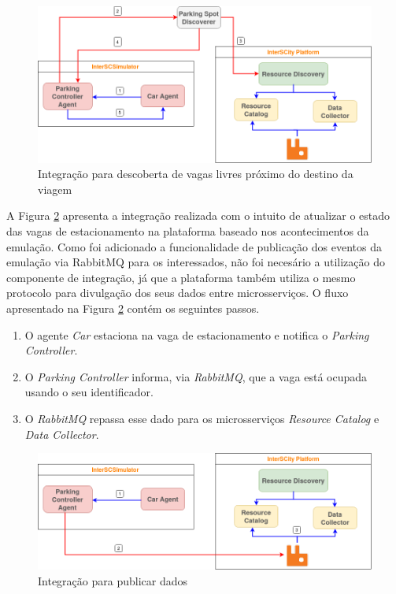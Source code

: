 \begin{figure}[ht]
	\centering
	\includegraphics[width=\textwidth]{figuras/integration_get_data_smart_parking.png}
	\caption{Integração para descoberta de vagas livres próximo do destino da
	viagem}
	\label{fig:descoberta}
\end{figure}

A Figura \ref{fig:atualizacao} apresenta a integração realizada com o intuito de atualizar o estado das vagas de estacionamento na plataforma baseado nos
acontecimentos da emulação.
Como foi adicionado a funcionalidade de publicação dos eventos da emulação via RabbitMQ para os interessados, não foi necesário a utilização do
componente de integração, já que a plataforma também utiliza o mesmo protocolo para divulgação dos seus dados entre microsserviços.
O fluxo apresentado na Figura \ref{fig:atualizacao} contém os seguintes passos.

\begin{enumerate}
    \item O agente \textit{Car} estaciona na vaga de estacionamento e notifica o \textit{Parking Controller}.

	\item O \textit{Parking Controller} informa, via \textit{RabbitMQ}, que a vaga está ocupada usando o seu identificador.

	\item O \textit{RabbitMQ} repassa esse dado para os microsserviços \textit{Resource Catalog} e \textit{Data Collector}.
\end{enumerate}

\begin{figure}[ht]
	\centering
	\includegraphics[width=\textwidth]{figuras/integration_publish_data_smart_parking.png}
	\caption{Integração para publicar dados}
	\label{fig:atualizacao}
\end{figure}

